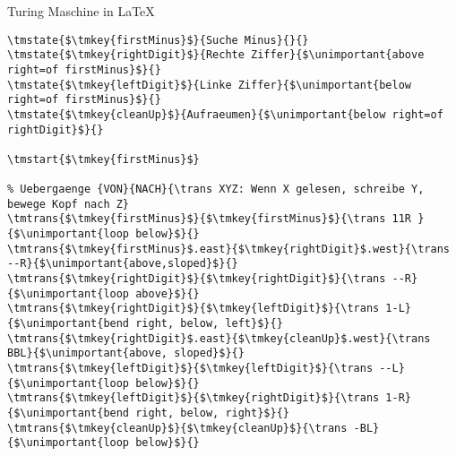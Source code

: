 
\newcommand{\unimportant}[1]{\textcolor{dunkelgrau!30}{#1}}
\newcommand{\tmkey}[1]{\textcolor{emorot}{#1}}

\begin{frame}[fragile]{Turing Maschine in \LaTeX}

\begin{lstlisting}[]
% Zustaende {Schluessel}{Name}{Formatierung}
\tmstate{$\tmkey{firstMinus}$}{Suche Minus}{}{}
\tmstate{$\tmkey{rightDigit}$}{Rechte Ziffer}{$\unimportant{above right=of firstMinus}$}{}
\tmstate{$\tmkey{leftDigit}$}{Linke Ziffer}{$\unimportant{below right=of firstMinus}$}{}
\tmstate{$\tmkey{cleanUp}$}{Aufraeumen}{$\unimportant{below right=of rightDigit}$}{}

\tmstart{$\tmkey{firstMinus}$}

% Uebergaenge {VON}{NACH}{\trans XYZ: Wenn X gelesen, schreibe Y, bewege Kopf nach Z}
\tmtrans{$\tmkey{firstMinus}$}{$\tmkey{firstMinus}$}{\trans 11R }{$\unimportant{loop below}$}{}
\tmtrans{$\tmkey{firstMinus}$.east}{$\tmkey{rightDigit}$.west}{\trans --R}{$\unimportant{above,sloped}$}{}
\tmtrans{$\tmkey{rightDigit}$}{$\tmkey{rightDigit}$}{\trans --R}{$\unimportant{loop above}$}{}
\tmtrans{$\tmkey{rightDigit}$}{$\tmkey{leftDigit}$}{\trans 1-L}{$\unimportant{bend right, below, left}$}{}
\tmtrans{$\tmkey{rightDigit}$.east}{$\tmkey{cleanUp}$.west}{\trans BBL}{$\unimportant{above, sloped}$}{}
\tmtrans{$\tmkey{leftDigit}$}{$\tmkey{leftDigit}$}{\trans --L}{$\unimportant{loop below}$}{}
\tmtrans{$\tmkey{leftDigit}$}{$\tmkey{rightDigit}$}{\trans 1-R}{$\unimportant{bend right, below, right}$}{}
\tmtrans{$\tmkey{cleanUp}$}{$\tmkey{cleanUp}$}{\trans -BL}{$\unimportant{loop below}$}{}
\end{lstlisting}
\end{frame}
